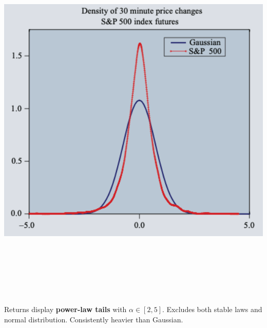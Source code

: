 \documentclass[final]{beamer}
\begin{document}
\begin{frame}[t]
\begin{columns}[t]
\begin{column}{.48\linewidth}
\begin{tcolorbox}[mybox, title=Heavy Tails Distribution]
\begin{center}
\includegraphics[width=0.98\linewidth,height=18cm,keepaspectratio]{figure2_density.png}
\end{center}
\vspace{0.3cm}
\large
Returns display \textbf{power-law tails} with $\alpha \in [2,5]$. Excludes both stable laws and normal distribution. Consistently heavier than Gaussian.
\end{tcolorbox}

\vspace{0.5cm}


\end{column}
\end{columns}
\end{frame}
\end{document}
